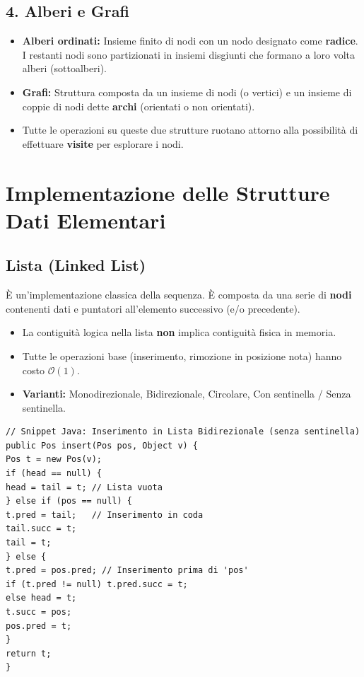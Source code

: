 \documentclass[12pt, a4paper]{article}
\begin{document}
\subsection{4. Alberi e Grafi}
\begin{itemize}
\item \textbf{Alberi ordinati:} Insieme finito di nodi con un nodo designato come \textbf{radice}. I restanti nodi sono partizionati in insiemi disgiunti che formano a loro volta alberi (sottoalberi).
\item \textbf{Grafi:} Struttura composta da un insieme di nodi (o vertici) e un insieme di coppie di nodi dette \textbf{archi} (orientati o non orientati).
\item Tutte le operazioni su queste due strutture ruotano attorno alla possibilità di effettuare \textbf{visite} per esplorare i nodi.
\end{itemize}

\newpage

\section{Implementazione delle Strutture Dati Elementari}

\subsection{Lista (Linked List)}
È un'implementazione classica della sequenza. È composta da una serie di \textbf{nodi} contenenti dati e puntatori all'elemento successivo (e/o precedente).
\begin{itemize}
\item La contiguità logica nella lista \textbf{non} implica contiguità fisica in memoria.
\item Tutte le operazioni base (inserimento, rimozione in posizione nota) hanno costo $\mathcal{O}(1)$.
\item \textbf{Varianti:} Monodirezionale, Bidirezionale, Circolare, Con sentinella / Senza sentinella.
\end{itemize}

\begin{verbatim}
// Snippet Java: Inserimento in Lista Bidirezionale (senza sentinella)
public Pos insert(Pos pos, Object v) {
Pos t = new Pos(v);
if (head == null) {
head = tail = t; // Lista vuota
} else if (pos == null) {
t.pred = tail;   // Inserimento in coda
tail.succ = t;
tail = t;
} else {
t.pred = pos.pred; // Inserimento prima di 'pos'
if (t.pred != null) t.pred.succ = t;
else head = t;
t.succ = pos;
pos.pred = t;
}
return t;
}
\end{verbatim}
\end{document}
